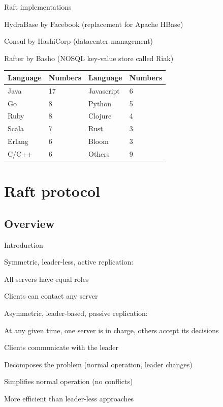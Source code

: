 \begin{frame}{Raft implementations}

\BI
\item HydraBase by Facebook (replacement for Apache HBase)
\item Consul by HashiCorp (datacenter management)
\item Rafter by Basho (NOSQL key-value store called Riak)
\EI


\bigskip
\begin{tabular}{| P{2.5cm} | P{2cm} | | P{2.5cm} | P{2cm} |}
\hline
\textbf{Language} & \textbf{Numbers} & \textbf{Language} & \textbf{Numbers}\\\hline
Java & 17 & Javascript & 6\\\hline
Go & 8  & Python & 5 \\\hline
Ruby & 8 & Clojure & 4 \\\hline
Scala & 7 & Rust & 3  \\\hline
Erlang & 6 & Bloom & 3 \\\hline
C/C++ & 6 & Others & 9 \\\hline
\end{tabular}
\end{frame}


\section{Raft protocol}

\subsection{Overview}

\begin{frame}{Introduction}

\BIL
\item Symmetric, leader-less, active replication:
	\BI
	\item All servers have equal roles
	\item Clients can contact any server
	\EI 
\item Asymmetric, leader-based, passive replication:
	\BI
	\item At any given time, one server is in charge, others accept its decisions
	\item Clients communicate with the leader 
	\EI
\EIL

\bigskip
{}
\BI
\item Decomposes the problem (normal operation, leader changes)
\item Simplifies normal operation (no conflicts)
\item More efficient than leader-less approaches
\EI

\end{frame}


